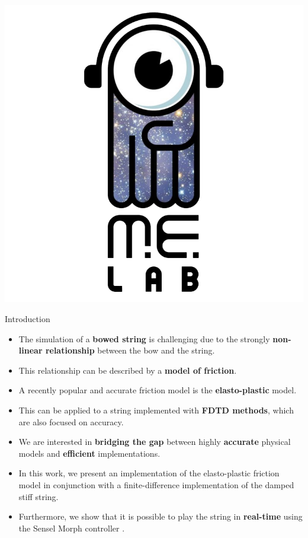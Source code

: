 \documentclass[a0paper,portrait]{baposter}
\let\oldbf\textbf
\renewcommand{\textbf}[1]{\textcolor{aaublue1}{\oldbf{#1}}}
\begin{document}
\begin{poster}
{  \includegraphics[height=0.75\headerheight]{melablogo.png}
}


\begin{posterbox}[name=intro,column=0,row=0]{Introduction}
\begin{itemize}
    \item The simulation of a \textbf{bowed string} is challenging due to the strongly \textbf{non-linear relationship} between the bow and the string.
    \item This relationship can be described by a \textbf{model of friction}.
    \item A recently popular and accurate friction model is the \textbf{elasto-plastic} model.
    \item This can be applied to a string implemented with \textbf{FDTD methods}, which are also focused on accuracy. 
    \item We are interested in \textbf{bridging the gap} between highly \textbf{accurate} physical models and \textbf{efficient} implementations. \item In this work, we present an implementation of the elasto-plastic friction model in conjunction with a finite-difference implementation of the damped stiff string. 
    \item Furthermore, we show that it is possible to play the string in \textbf{real-time} using the Sensel Morph controller \cite{Sensel2019}.
\end{itemize}
\end{posterbox}


\end{poster}
\end{document}
